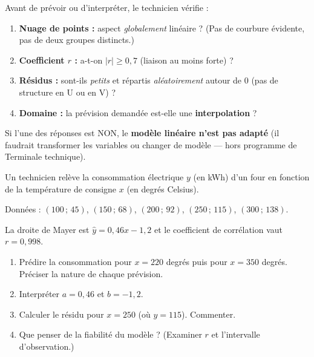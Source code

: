 \documentclass[11pt]{article}
\begin{document}
\begin{attention}
Avant de prévoir ou d'interpréter, le technicien vérifie :
\begin{enumerate}
    \item \textbf{Nuage de points :} aspect \emph{globalement} linéaire ? (Pas de courbure évidente, pas de deux groupes distincts.)
    \item \textbf{Coefficient $r$ :} a-t-on $|r| \ge 0,7$ (liaison au moins forte) ?
    \item \textbf{Résidus :} sont-ils \emph{petits} et répartis \emph{aléatoirement} autour de 0 (pas de structure en U ou en V) ?
    \item \textbf{Domaine :} la prévision demandée est-elle une \textbf{interpolation} ?
\end{enumerate}
Si l'une des réponses est NON, le \textbf{modèle linéaire n'est pas adapté} (il faudrait transformer les variables ou changer de modèle — hors programme de Terminale technique).
\end{attention}

\begin{exercice}
Un technicien relève la consommation électrique $y$ (en kWh) d'un four en fonction de la température de consigne $x$ (en degrés Celsius).

Données : $(100\,;\,45)$, $(150\,;\,68)$, $(200\,;\,92)$, $(250\,;\,115)$, $(300\,;\,138)$.

La droite de Mayer est $\hat{y} = 0,46x - 1,2$ et le coefficient de corrélation vaut $r = 0,998$.

\begin{enumerate}
    \item Prédire la consommation pour $x = 220$ degrés puis pour $x = 350$ degrés. Préciser la nature de chaque prévision.
    \item Interpréter $a = 0,46$ et $b = -1,2$.
    \item Calculer le résidu pour $x = 250$ (où $y = 115$). Commenter.
    \item Que penser de la fiabilité du modèle ? (Examiner $r$ et l'intervalle d'observation.)
\end{enumerate}
\end{exercice}
\end{document}

